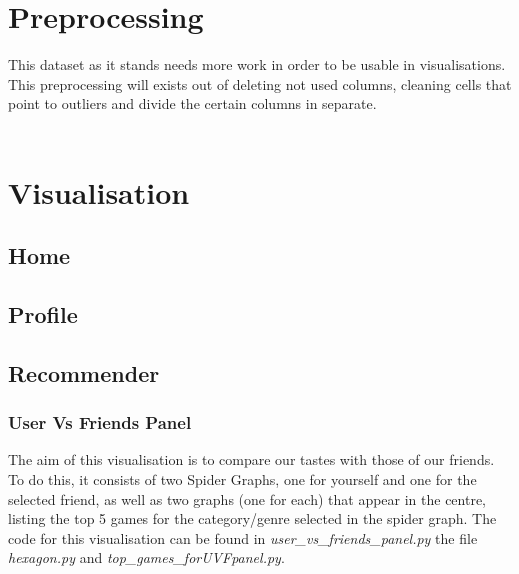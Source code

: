 \documentclass{article}
\begin{document}
	\newpage
	
	\section{Preprocessing}
	
	This dataset as it stands needs more work in order to be usable in visualisations. This preprocessing will exists out of deleting not used columns, cleaning cells that point to outliers and divide the certain columns in separate.\\
	\\
	
	
	\section{Visualisation}
	\subsection{Home}

	\subsection{Profile}

	\subsection{Recommender}
	\subsubsection{User Vs Friends Panel}
	The aim of this visualisation is to compare our tastes with those of our friends. To do this, it consists of two Spider Graphs, one for yourself and one for the selected friend, as well as two graphs (one for each) that appear in the centre, listing the top 5 games for the category/genre selected in the spider graph. The code for this visualisation can be found in \textit{user\_vs\_friends\_panel.py} the file \textit{hexagon.py} and \textit{top\_games\_forUVFpanel.py}.
\end{document}
